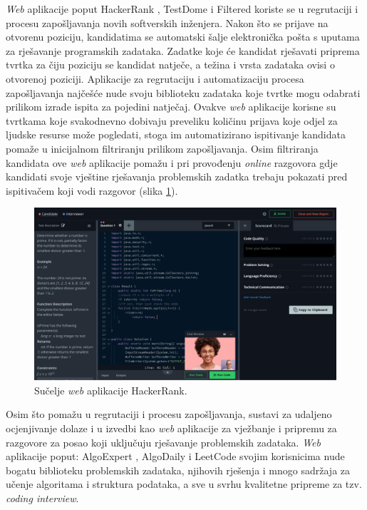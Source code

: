 \documentclass[times, utf8, diplomski]{fer}
\begin{document}
\textit{Web} aplikacije poput HackerRank \citep{HackerRank}, TestDome \citep{TestDome} i Filtered \citep{Filtered} koriste se u regrutaciji i procesu zapošljavanja novih softverskih inženjera. Nakon što se prijave na otvorenu poziciju, kandidatima se automatski šalje elektronička pošta s uputama za rješavanje programskih zadataka. Zadatke koje će kandidat rješavati priprema tvrtka za čiju poziciju se kandidat natječe, a težina i vrsta zadataka ovisi o otvorenoj poziciji. Aplikacije za regrutaciju i automatizaciju procesa zapošljavanja najčešće nude svoju biblioteku zadataka koje tvrtke mogu odabrati prilikom izrade ispita za pojedini natječaj. Ovakve \textit{web} aplikacije korisne su tvrtkama koje svakodnevno dobivaju preveliku količinu prijava koje odjel za ljudske resurse može pogledati, stoga im automatizirano ispitivanje kandidata pomaže u inicijalnom filtriranju  prilikom zapošljavanja. Osim filtriranja kandidata ove \textit{web} aplikacije pomažu i pri provođenju \textit{online} razgovora gdje kandidati svoje vještine rješavanja problemskih zadatka trebaju pokazati pred ispitivačem koji vodi razgovor (slika \ref{fig:hackerrank-ui}).

\begin{figure}[htb]
	\centering
	\includegraphics[width=\textwidth]{images/hackerrank-ui.png}
	\caption{
		Sučelje \textit{web} aplikacije HackerRank. \citep{HackerRank}
	}
	\label{fig:hackerrank-ui}
\end{figure}

Osim što pomažu u regrutaciji i procesu zapošljavanja, sustavi za udaljeno ocjenjivanje dolaze i u izvedbi kao \textit{web} aplikacije za vježbanje i pripremu za razgovore za posao koji uključuju rješavanje problemskih zadataka. \textit{Web} aplikacije poput: AlgoExpert \citep{AlgoExpert}, AlgoDaily \citep{AlgoDaily} i LeetCode \citep{LeetCode} svojim korisnicima nude bogatu biblioteku problemskih zadataka, njihovih rješenja i mnogo sadržaja za učenje algoritama i struktura podataka, a sve u svrhu kvalitetne pripreme za tzv. \textit{coding interview}.
\end{document}
